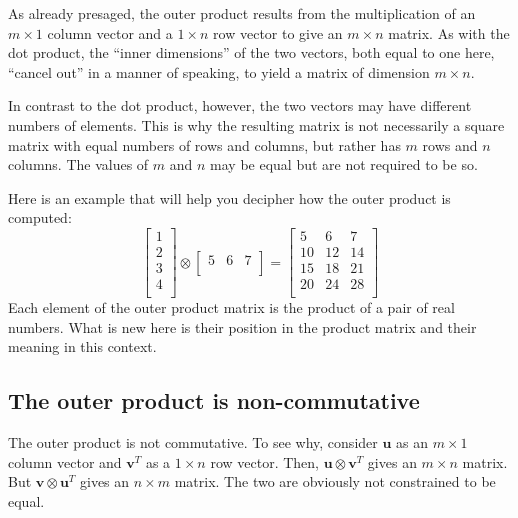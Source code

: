 \documentclass[
  a4paper,
]{article}
\begin{document}
As already presaged, the outer product results from the multiplication
of an \(m \times 1\) column vector and a \(1 \times n\) row vector to
give an \(m \times n\) matrix. As with the dot product, the ``inner
dimensions'' of the two vectors, both equal to one here, ``cancel out''
in a manner of speaking, to yield a matrix of dimension \(m \times n\).

In contrast to the dot product, however, the two vectors may have
different numbers of elements. This is why the resulting matrix is not
necessarily a square matrix with equal numbers of rows and columns, but
rather has \(m\) rows and \(n\) columns. The values of \(m\) and \(n\)
may be equal but are not required to be so.

Here is an example that will help you decipher how the outer product is
computed: \[
\begin{bmatrix}
1\\2\\3\\4\\
\end{bmatrix}
\otimes
\begin{bmatrix}
5 & 6 & 7\\
\end{bmatrix}
= %
\begin{bmatrix}
5 & 6 & 7\\
10 & 12 & 14\\
15 & 18 & 21\\
20 & 24 & 28\\
\end{bmatrix}
\] Each element of the outer product matrix is the product of a pair of
real numbers. What is new here is their position in the product matrix
and their meaning in this context.

\hypertarget{the-outer-product-is-non-commutative}{%
\subsection{The outer product is
non-commutative}\label{the-outer-product-is-non-commutative}}

The outer product is not commutative. To see why, consider
\(\mathbf{u}\) as an \(m \times 1\) column vector and \(\mathbf{v}^{T}\)
as a \(1 \times n\) row vector. Then,
\(\mathbf{u} \otimes \mathbf{v}^{T}\) gives an \(m \times n\) matrix.
But \(\mathbf{v} \otimes \mathbf{u}^{T}\) gives an \(n \times m\)
matrix. The two are obviously not constrained to be equal.
\end{document}
